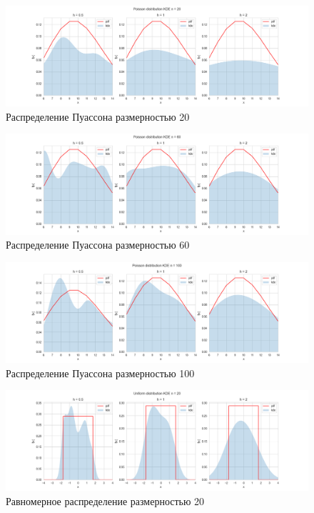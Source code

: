 \documentclass[a4paper,14pt]{article}
\begin{document}
	\begin{figure}[H]
		\centering
		\includegraphics[scale=0.35]{../image/lab4/lab4_kde_poisson_20.png}
		\caption{Распределение Пуассона размерностью 20}
	\end{figure}
	
	\begin{figure}[H]
		\centering
		\includegraphics[scale=0.35]{../image/lab4/lab4_kde_poisson_60.png}
		\caption{Распределение Пуассона размерностью 60}
	\end{figure}
	
	\begin{figure}[H]
		\centering
		\includegraphics[scale=0.35]{../image/lab4/lab4_kde_poisson_100.png}
		\caption{Распределение Пуассона размерностью 100}
	\end{figure}
	
	\begin{figure}[H]
		\centering
		\includegraphics[scale=0.35]{../image/lab4/lab4_kde_uniform_20.png}
		\caption{Равномерное распределение размерностью 20}
	\end{figure}
	
\end{document}
